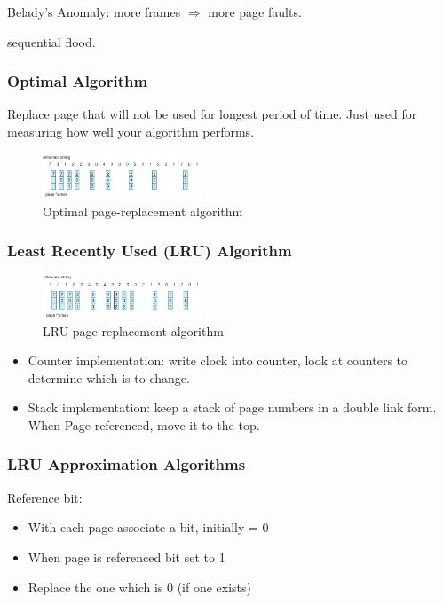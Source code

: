 Belady's Anomaly: more frames $\Rightarrow$ more page faults. 

sequential flood. 

\subsubsection{Optimal Algorithm}
Replace page that will not be used for longest period of time. Just used for measuring how well your algorithm performs. 

\begin{figure}[!htb]
    \centering
    \includegraphics[width=0.42\textwidth]{pic/OS9/Optimal page-replacement algorithm}
    \caption{Optimal page-replacement algorithm}
\end{figure}

\subsubsection{Least Recently Used (LRU) Algorithm}
\begin{figure}[!htb]
    \centering
    \includegraphics[width=0.42\textwidth]{pic/OS9/LRU page-replacement algorithm}
    \caption{LRU page-replacement algorithm}
\end{figure}

\begin{itemize}
    \item Counter implementation: write clock into counter, look at counters to determine which is to change. 
    \item Stack implementation: keep a stack of page numbers in a double
    link form. When Page referenced, move it to the top. 
\end{itemize}

\subsubsection{LRU Approximation Algorithms}
Reference bit: 
\begin{itemize}\scriptsize
    \item With each page associate a bit, initially = 0
    \item When page is referenced bit set to 1
    \item Replace the one which is 0 (if one exists)
\end{itemize}

